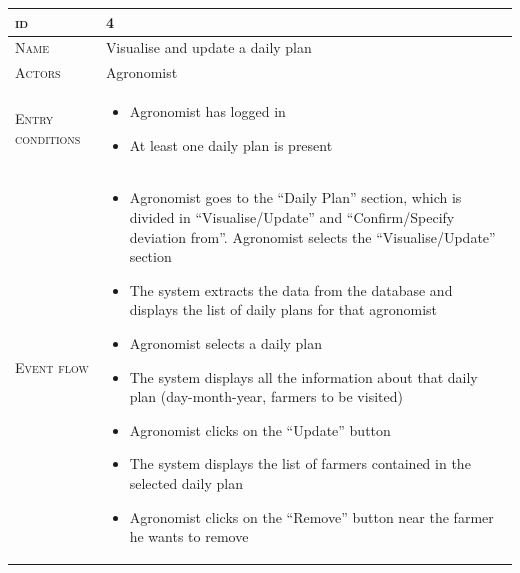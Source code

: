 \begin{table}[H]
    \centering
    \begin{tabular}[c]{|l|p{}|}
        \hline %
    	\textsc{id}                 &   4\\
    	\hline %
    	\textsc{Name}               &   Visualise and update a daily plan\\
    	\hline %
    	\textsc{Actors}             &   Agronomist\\
    	\hline %
    	\textsc{Entry conditions}   &   \begin{itemize}
                                    	    \item Agronomist has logged in
                                    	    \item At least one daily plan is present
                                        \end{itemize}\\
    	\hline %
    	\textsc{Event flow}         &   %
            	                        \begin{itemize}
                                    	    \item Agronomist goes to the “Daily Plan” section, which is divided in “Visualise/Update” and “Confirm/Specify deviation from”. Agronomist selects the “Visualise/Update” section
                                    		\item The system extracts the data from the database and displays the list of daily plans for that agronomist
                                    		\item Agronomist selects a daily plan
                                    		\item The system displays all the information about that daily plan (day-month-year, farmers to be visited)
                                    		\item Agronomist clicks on the “Update” button
                                    		\item The system displays the list of farmers contained in the selected daily plan
                                    		\item Agronomist clicks on the “Remove” button near the farmer he wants to remove

\end{itemize}
\end{tabular}
\end{table}
